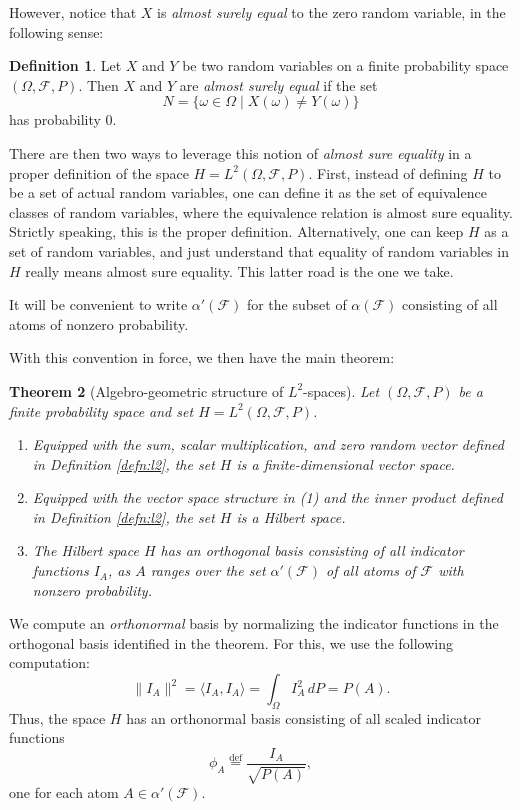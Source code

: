 \documentclass[11pt]{book}
\newtheorem{thm}{Theorem}[section]
\theoremstyle{definition}
\newtheorem{defn}[thm]{Definition}
\numberwithin{equation}{section}
\begin{document}
However, notice that $X$ is \textit{almost surely equal} to the zero random variable, in the following sense:

\begin{defn}
	Let $X$ and $Y$ be two random variables on a finite probability space $(\Omega, \mathcal{F}, P)$. Then $X$ and $Y$ are \textit{almost surely equal} if the set
	\[
		N = \{\omega \in \Omega \mid X(\omega) \neq Y(\omega) \}
	\]
	has probability $0$.
\end{defn}

There are then two ways to leverage this notion of \textit{almost sure equality} in a proper definition of the space $H = L^2(\Omega, \mathcal{F},P)$. First, instead of defining $H$ to be a set of actual random variables, one can define it as the set of equivalence classes of random variables, where the equivalence relation is almost sure equality. Strictly speaking, this is the proper definition. Alternatively, one can keep $H$ as a set of random variables, and just understand that equality of random variables in $H$ really means almost sure equality. This latter road is the one we take.

It will be convenient to write $\alpha'(\mathcal{F})$ for the subset of $\alpha(\mathcal{F})$ consisting of all atoms of nonzero probability.

With this convention in force, we then have the main theorem:

\begin{thm}[Algebro-geometric structure of $L^2$-spaces]\label{thm:hilbert}
	Let $(\Omega, \mathcal{F}, P)$ be a finite probability space and set $H = L^2(\Omega, \mathcal{F}, P)$.
	\begin{enumerate}
		\item Equipped with the sum, scalar multiplication, and zero random vector defined in Definition \ref{defn:l2}, the set $H$ is a finite-dimensional vector space.
		\item Equipped with the vector space structure in (1) and the inner product defined in Definition \ref{defn:l2}, the set $H$ is a Hilbert space.
		\item The Hilbert space $H$ has an orthogonal basis consisting of all indicator functions $I_A$, as $A$ ranges over the set $\alpha'(\mathcal{F})$ of all atoms of $\mathcal{F}$ with nonzero probability.
	\end{enumerate}
\end{thm}

We compute an \textit{orthonormal} basis by normalizing the indicator functions in the orthogonal basis identified in the theorem. For this, we use the following computation:
\[
	\| I_A \|^2 = \langle I_A, I_A \rangle = \int_\Omega I_A^2 \, dP = P(A).
\]
Thus, the space $H$ has an orthonormal basis consisting of all scaled indicator functions
\begin{equation}\label{eq:onb}
	\phi_A \stackrel{\text{def}}{=} \frac{I_A}{\sqrt{P(A)}},
\end{equation}
one for each atom $A\in \alpha'(\mathcal{F})$.
\end{document}
